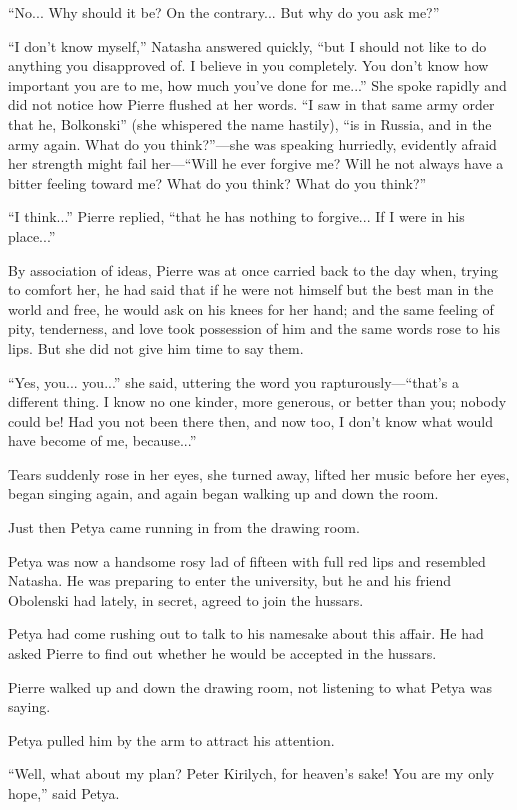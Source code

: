 ``No... Why should it be? On the contrary... But why do you ask
me?''

``I don't know myself,'' Natasha answered quickly, ``but I should
not like to do anything you disapproved of. I believe in you
completely. You don't know how important you are to me, how much
you've done for me...''  She spoke rapidly and did not notice how
Pierre flushed at her words. ``I saw in that same army order that
he, Bolkonski'' (she whispered the name hastily), ``is in Russia,
and in the army again. What do you think?''---she was speaking
hurriedly, evidently afraid her strength might fail her---``Will
he ever forgive me? Will he not always have a bitter feeling
toward me? What do you think? What do you think?''

``I think...'' Pierre replied, ``that he has nothing to
forgive... If I were in his place...''

By association of ideas, Pierre was at once carried back to the
day when, trying to comfort her, he had said that if he were not
himself but the best man in the world and free, he would ask on
his knees for her hand; and the same feeling of pity, tenderness,
and love took possession of him and the same words rose to his
lips. But she did not give him time to say them.

``Yes, you... you...'' she said, uttering the word you
rapturously---``that's a different thing. I know no one kinder,
more generous, or better than you; nobody could be! Had you not
been there then, and now too, I don't know what would have become
of me, because...''

Tears suddenly rose in her eyes, she turned away, lifted her
music before her eyes, began singing again, and again began
walking up and down the room.

Just then Petya came running in from the drawing room.

Petya was now a handsome rosy lad of fifteen with full red lips
and resembled Natasha. He was preparing to enter the university,
but he and his friend Obolenski had lately, in secret, agreed to
join the hussars.

Petya had come rushing out to talk to his namesake about this
affair. He had asked Pierre to find out whether he would be
accepted in the hussars.

Pierre walked up and down the drawing room, not listening to what
Petya was saying.

Petya pulled him by the arm to attract his attention.

``Well, what about my plan? Peter Kirilych, for heaven's sake!
You are my only hope,'' said Petya.

